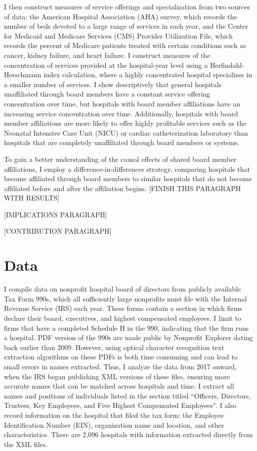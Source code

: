 \documentclass[12pt]{article}
\begin{document}
    I then construct measures of service offerings and specialization from two sources of data: the American Hospital Association (AHA) survey, which records the number of beds devoted to a large range of services in each year, and the Center for Medicaid and Medicare Services (CMS) Provider Utilization File, which records the percent of Medicare patients treated with certain conditions such as cancer, kidney failure, and heart failure. I construct measures of the concentration of services provided at the hospital-year level using a Herfindahl-Herschmann index calculation, where a highly concentrated hospital specializes in a smaller number of services. I show descriptively that general hospitals unaffiliated through board members have a constant service offering concentration over time, but hospitals with board member affiliations have an increasing service concentration over time. Additionally, hospitals with board member affiliations are more likely to offer highly profitable services such as the Neonatal Intensive Care Unit (NICU) or cardiac catheterization laboratory than hospitals that are completely unaffiliated through board members or systems. 

    To gain a better understanding of the causal effects of shared board member affiliations, I employ a difference-in-differences strategy, comparing hospitals that become affiliated through board members to similar hospitals that do not become affiliated before and after the affiliation begins. [FINISH THIS PARAGRAPH WITH RESULTS]

    [IMPLICATIONS PARAGRAPH]

    [CONTRIBUTION PARAGRAPH]

    \section{Data}

    
   I compile data on nonprofit hospital board of directors from publicly available Tax Form 990s, which all sufficiently large nonprofits must file with the Internal Revenue Service (IRS) each year. These forms contain a section in which firms declare their board, executives, and highest compensated employees. I limit to firms that have a completed Schedule H in the 990, indicating that the firm runs a hospital. PDF version of the 990s are made public by Nonprofit Explorer dating back earlier than 2009. However, using optical character recognition text extraction algorithms on these PDFs is both time consuming and can lead to small errors in names extracted. Thus, I analyze the data from 2017 onward, when the IRS began publishing XML versions of these files, ensuring more accurate names that can be matched across hospitals and time. I extract all names and positions of individuals listed in the section titled ``Officers, Directors, Trustees, Key Employees, and Five Highest Compensated Employees". I also record information on the hospital that filed the tax form: the Employee Identification Number (EIN), organization name and location, and other characteristics. There are 2,096 hospitals with information extracted directly from the XML files. 
\end{document}
